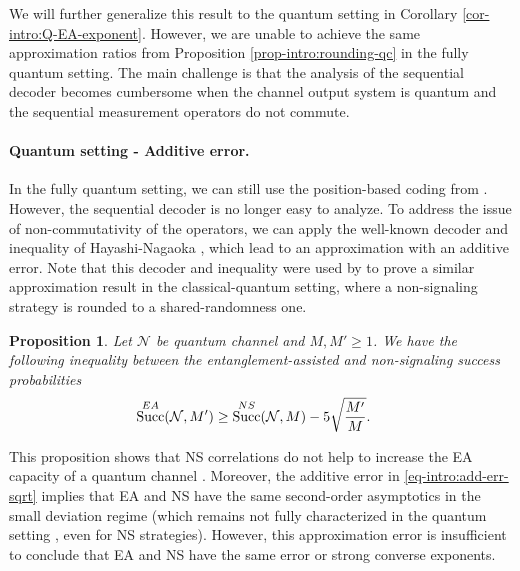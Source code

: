 \documentclass[a4paper,onecolumn,11pt,accepted=2025-10-01]{quantumarticle}
\newtheorem{prop}[theorem]{Proposition}
\DeclareMathOperator{\suc}{Succ}
\newcommand*{\cN}{\mathcal{N}}
\newcommand*{\eps}{\varepsilon}
\begin{document}
We will further generalize this result to the quantum setting in Corollary \ref{cor-intro:Q-EA-exponent}. However, we are unable to achieve the same approximation ratios from Proposition \ref{prop-intro:rounding-qc} in the fully quantum setting. The main challenge is that the analysis of the sequential decoder becomes cumbersome when the channel  output system is quantum and the sequential measurement operators do not commute.

\paragraph{Quantum setting - Additive error.}
In the fully quantum setting, we can still use the position-based coding from \cite{Anshu2018Jun}. However, the sequential decoder is no longer easy to analyze. To address the issue of non-commutativity of the operators, we can apply the well-known decoder and inequality of Hayashi-Nagaoka \cite{Hayashi2003Jun}, which lead to an approximation with an additive error. Note that  this decoder and inequality were used by \cite{Fawzi19} to prove a similar approximation result in the classical-quantum setting, where a non-signaling strategy is rounded to a shared-randomness one.

\begin{prop}\label{prop-intro:rounding-qq}
Let $\cN$ be quantum channel and $M, M'\ge 1$. %
We have the following inequality between the entanglement-assisted and non-signaling success probabilities 
\begin{align}\label{eq-intro:add-err-sqrt}
  \suc_{}^{\rm{EA}}(\cN,M')&\ge   \suc^{\rm{NS}}(\cN,M)  -5 \sqrt{\frac{M'}{M}}. 
\end{align}
\end{prop}

This proposition shows that NS correlations do not help to increase the EA capacity of a quantum channel \cite{Leung2015Jun}. 
 Moreover, 
 the additive error  in \eqref{eq-intro:add-err-sqrt}  implies that EA and NS have the same second-order asymptotics in the small deviation regime (which remains not fully characterized in the quantum setting \cite{Datta2016Jun}, even for NS strategies). However, this approximation error is insufficient  to conclude that EA and NS have the same error or strong converse exponents. 
\end{document}
